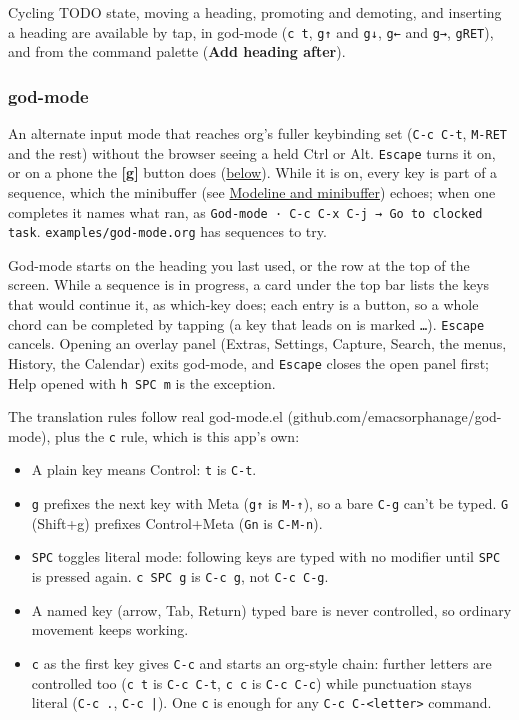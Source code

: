 \documentclass[11pt]{article}
\begin{document}
Cycling TODO state, moving a heading, promoting and demoting, and inserting a heading are available by tap, in god-mode (\texttt{c t}, \texttt{g↑} and \texttt{g↓}, \texttt{g←} and \texttt{g→}, \texttt{gRET}), and from the command palette (\textbf{Add heading after}).

\subsubsection{god-mode}
\label{sec:orgc091c26}
An alternate input mode that reaches org's fuller keybinding set (\texttt{C-c C-t}, \texttt{M-RET} and the rest) without the browser seeing a held Ctrl or Alt. \texttt{Escape} turns it on, or on a phone the \textbf{[g]} button does (\hyperref[sec:org6e28df8]{below}). While it is on, every key is part of a sequence, which the minibuffer (see \hyperref[sec:org87b300e]{Modeline and minibuffer}) echoes; when one completes it names what ran, as \texttt{God-mode · C-c C-x C-j → Go to clocked task}. \texttt{examples/god-mode.org} has sequences to try.

God-mode starts on the heading you last used, or the row at the top of the screen. While a sequence is in progress, a card under the top bar lists the keys that would continue it, as which-key does; each entry is a button, so a whole chord can be completed by tapping (a key that leads on is marked \texttt{…}). \texttt{Escape} cancels. Opening an overlay panel (Extras, Settings, Capture, Search, the menus, History, the Calendar) exits god-mode, and \texttt{Escape} closes the open panel first; Help opened with \texttt{h SPC m} is the exception.

The translation rules follow real god-mode.el (github.com/emacsorphanage/god-mode), plus the \texttt{c} rule, which is this app's own:

\begin{itemize}
\item A plain key means Control: \texttt{t} is \texttt{C-t}.
\item \texttt{g} prefixes the next key with Meta (\texttt{g↑} is \texttt{M-↑}), so a bare \texttt{C-g} can't be typed. \texttt{G} (Shift+g) prefixes Control+Meta (\texttt{Gn} is \texttt{C-M-n}).
\item \texttt{SPC} toggles literal mode: following keys are typed with no modifier until \texttt{SPC} is pressed again. \texttt{c SPC g} is \texttt{C-c g}, not \texttt{C-c C-g}.
\item A named key (arrow, Tab, Return) typed bare is never controlled, so ordinary movement keeps working.
\item \texttt{c} as the first key gives \texttt{C-c} and starts an org-style chain: further letters are controlled too (\texttt{c t} is \texttt{C-c C-t}, \texttt{c c} is \texttt{C-c C-c}) while punctuation stays literal (\texttt{C-c .}, \texttt{C-c |}). One \texttt{c} is enough for any \texttt{C-c C-<letter>} command.
\end{itemize}
\end{document}
